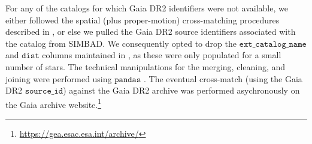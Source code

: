 \documentclass[12pt,modern,twocolumn,tighten]{aastex63}
\newcommand{\cn}{$\delta$\ Lyr\ cluster} %
\newcommand{\bpmrpo}{(G_{\rm BP}-G_{\rm RP})_0}
\begin{document}
For any of the catalogs for which Gaia DR2 identifiers were not
available, we either followed the spatial (plus proper-motion)
cross-matching procedures described in \citet{bouma_cdipsI_2019}, or
else we pulled the Gaia DR2 source identifiers associated with the
catalog from SIMBAD.  We consequently opted to drop the
$\texttt{ext\_catalog\_name}$ and $\texttt{dist}$ columns maintained
in \citet{bouma_cdipsI_2019}, as these were only populated for a small
number of stars.  The technical manipulations for the merging,
cleaning, and joining were performed using $\texttt{pandas}$
\citep{mckinney-proc-scipy-2010}.  The eventual cross-match (using the
Gaia DR2 $\texttt{source\_id}$) against the Gaia DR2 archive was
performed asychronously on the Gaia archive
website.\footnote{\url{https://gea.esac.esa.int/archive/}}


% 
% 
% 
% 
\end{document}
